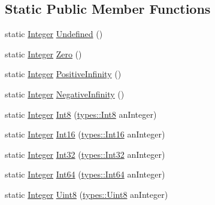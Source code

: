 \subsection*{Static Public Member Functions}
\begin{DoxyCompactItemize}
\item 
static \hyperlink{classostk_1_1core_1_1types_1_1_integer}{Integer} \hyperlink{classostk_1_1core_1_1types_1_1_integer_a389855c42819131d631ce512f0fc6947}{Undefined} ()
\item 
static \hyperlink{classostk_1_1core_1_1types_1_1_integer}{Integer} \hyperlink{classostk_1_1core_1_1types_1_1_integer_ad73cf716de8cc2cecd7ce0c1a08ffebd}{Zero} ()
\item 
static \hyperlink{classostk_1_1core_1_1types_1_1_integer}{Integer} \hyperlink{classostk_1_1core_1_1types_1_1_integer_aa68aae18df406d47e083d844e85a4291}{Positive\+Infinity} ()
\item 
static \hyperlink{classostk_1_1core_1_1types_1_1_integer}{Integer} \hyperlink{classostk_1_1core_1_1types_1_1_integer_a65f0693362d3f0bffb5aabcb8c4d933d}{Negative\+Infinity} ()
\item 
static \hyperlink{classostk_1_1core_1_1types_1_1_integer}{Integer} \hyperlink{classostk_1_1core_1_1types_1_1_integer_a1d7ebe5ffa54a2efb01c1aeb9ba627d9}{Int8} (\hyperlink{namespaceostk_1_1core_1_1types_ad9a0dc0d53ae20e4a53ab8a250d56de3}{types\+::\+Int8} an\+Integer)
\item 
static \hyperlink{classostk_1_1core_1_1types_1_1_integer}{Integer} \hyperlink{classostk_1_1core_1_1types_1_1_integer_a79a833b5c9789c7a6f36eb203e7e4f67}{Int16} (\hyperlink{namespaceostk_1_1core_1_1types_a88d90d717aac6c91b44fd07ec87cf3da}{types\+::\+Int16} an\+Integer)
\item 
static \hyperlink{classostk_1_1core_1_1types_1_1_integer}{Integer} \hyperlink{classostk_1_1core_1_1types_1_1_integer_a19c51e1678e5f1c81f56de9e8abae1c0}{Int32} (\hyperlink{namespaceostk_1_1core_1_1types_abc111a0d1129d03945e9bc2e975158ab}{types\+::\+Int32} an\+Integer)
\item 
static \hyperlink{classostk_1_1core_1_1types_1_1_integer}{Integer} \hyperlink{classostk_1_1core_1_1types_1_1_integer_a972bbf8a659c7925134c811101f86612}{Int64} (\hyperlink{namespaceostk_1_1core_1_1types_ad98fda0b92ffe48abffa77d65cb42113}{types\+::\+Int64} an\+Integer)
\item 
static \hyperlink{classostk_1_1core_1_1types_1_1_integer}{Integer} \hyperlink{classostk_1_1core_1_1types_1_1_integer_ab7200cccf84a134060301d1c3901d522}{Uint8} (\hyperlink{namespaceostk_1_1core_1_1types_a46cad24446bacb3f8bf605a53671ab24}{types\+::\+Uint8} an\+Integer)

\end{DoxyCompactItemize}
